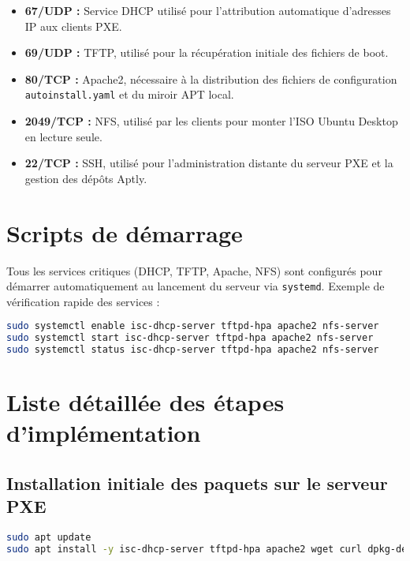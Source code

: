 \documentclass[a4paper,12pt]{article}
\begin{document}
\begin{itemize}
\item \textbf{67/UDP :} Service DHCP utilisé pour l'attribution automatique d’adresses IP aux clients PXE.
\item \textbf{69/UDP :} TFTP, utilisé pour la récupération initiale des fichiers de boot.
\item \textbf{80/TCP :} Apache2, nécessaire à la distribution des fichiers de configuration \texttt{autoinstall.yaml} et du miroir APT local.
\item \textbf{2049/TCP :} NFS, utilisé par les clients pour monter l'ISO Ubuntu Desktop en lecture seule.
\item \textbf{22/TCP :} SSH, utilisé pour l’administration distante du serveur PXE et la gestion des dépôts Aptly.
\end{itemize}

\section{Scripts de démarrage}
Tous les services critiques (DHCP, TFTP, Apache, NFS) sont configurés pour démarrer automatiquement au lancement du serveur via \texttt{systemd}. Exemple de vérification rapide des services :

\begin{lstlisting}[language=bash]
sudo systemctl enable isc-dhcp-server tftpd-hpa apache2 nfs-server
sudo systemctl start isc-dhcp-server tftpd-hpa apache2 nfs-server
sudo systemctl status isc-dhcp-server tftpd-hpa apache2 nfs-server
\end{lstlisting}

\section{Liste détaillée des étapes d’implémentation}

\subsection{Installation initiale des paquets sur le serveur PXE}

\begin{lstlisting}[language=bash]
sudo apt update
sudo apt install -y isc-dhcp-server tftpd-hpa apache2 wget curl dpkg-dev xorriso openssh-server nfs-kernel-server aptly gnupg2 pxelinux syslinux-common equivs ansible php libapache2-mod-php'
\end{lstlisting}
\end{document}
